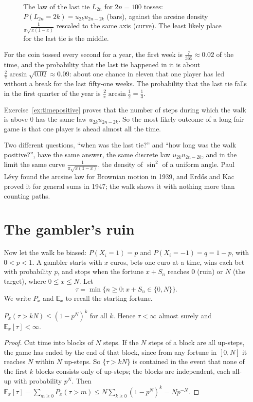 \begin{figure}[ht]
\centering
{}
\caption{The law of the last tie $L_{2n}$ for $2n=100$ tosses: $P(L_{2n}=2k)=u_{2k}u_{2n-2k}$ (bars), against the arcsine density
$\frac1{\pi\sqrt{x(1-x)}}$ rescaled to the same axis (curve). The least likely place for the last tie is the middle.}
\label{fig:arcsine}
\end{figure}

For the coin tossed every second for a year, the first week is $\frac7{365}\approx0.02$ of the time, and the probability that
the last tie happened in it is about $\frac2\pi\arcsin\sqrt{0.02}\approx0.09$: about one chance in eleven that one player has led
without a break for the last fifty-one weeks. The probability that the last tie falls in the first quarter of the
year is $\frac2\pi\arcsin\frac12=\frac13$.

Exercise~\ref{ex:timepositive} proves that the number of steps during which the walk is above $0$ has the same law
$u_{2k}u_{2n-2k}$. So the most likely outcome of a long fair game is that one player is ahead almost all the time.

\begin{beauty}
Two different questions, ``when was the last tie?'' and ``how long was the walk positive?'', have the same answer,
the same discrete law $u_{2k}u_{2n-2k}$, and in the limit the same curve $\frac1{\pi\sqrt{x(1-x)}}$, the density of $\sin^2$ of a uniform angle.
Paul Lévy found the arcsine law for Brownian motion in 1939, and Erdős and Kac proved it for general sums in
1947; the walk shows it with nothing more than counting paths.
\end{beauty}

\section{The gambler's ruin}

Now let the walk be biased: $P(X_i=1)=p$ and $P(X_i=-1)=q=1-p$, with $0<p<1$. A gambler starts with $x$ euros, bets one
euro at a time, wins each bet with probability $p$, and stops when the fortune $x+S_n$ reaches $0$ (ruin) or $N$ (the
target), where $0\le x\le N$. Let
\[
\tau=\min\{n\ge0:x+S_n\in\{0,N\}\}.
\]
We write $P_x$ and $\mathbb E_x$ to recall the starting fortune.

\begin{lemma}\label{lem:exit}
$P_x(\tau>kN)\le(1-p^N)^k$ for all $k$. Hence $\tau<\infty$ almost surely and $\mathbb E_x[\tau]<\infty$.
\end{lemma}
\begin{proof}
Cut time into blocks of $N$ steps. If the $N$ steps of a block are all up-steps, the game has ended by the end of that
block, since from any fortune in $[0,N]$ it reaches $N$ within $N$ up-steps. So $\{\tau>kN\}$ is contained in the event that none of
the first $k$ blocks consists only of up-steps; the blocks are independent, each all-up with probability $p^N$. Then
$\mathbb E_x[\tau]=\sum_{m\ge0}P_x(\tau>m)\le N\sum_{k\ge0}(1-p^N)^k=Np^{-N}$.
\end{proof}

